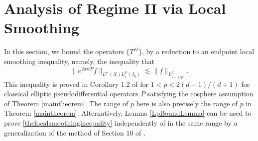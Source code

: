 \begin{comment}






% 


\end{comment}








\section{Analysis of Regime II via Local Smoothing} \label{regime2finalsection}

In this section, we bound the operators $\{ T^{II} \}$, by a reduction to an endpoint local smoothing inequality, namely, the inequality that
%
\begin{equation} \label{thelocalsmoothinginequality}
    \| e^{2\pi i t P} f \|_{L^{p'}(X) L^{p'}_t(I_0)} \lesssim \| f \|_{L^{p'}_{s - 1/p'}}.
\end{equation}
%
This inequality is proved in Corollary 1.2 of \cite{LeeSeeger} for $1 < p < 2(d-1)/(d+1)$ for classical elliptic pseudodifferential operators $P$ satisfying the cosphere assumption of Theorem \ref{maintheorem}. The range of $p$ here is also precisely the range of $p$ in Theorem \ref{maintheorem}. Alternatively, Lemma \ref{LpBoundLemma} can be used to prove \eqref{thelocalsmoothinginequality} independently of \cite{LeeSeeger} in the same range by a generalization of the method of Section 10 of \cite{HeoandNazarovandSeeger}.

